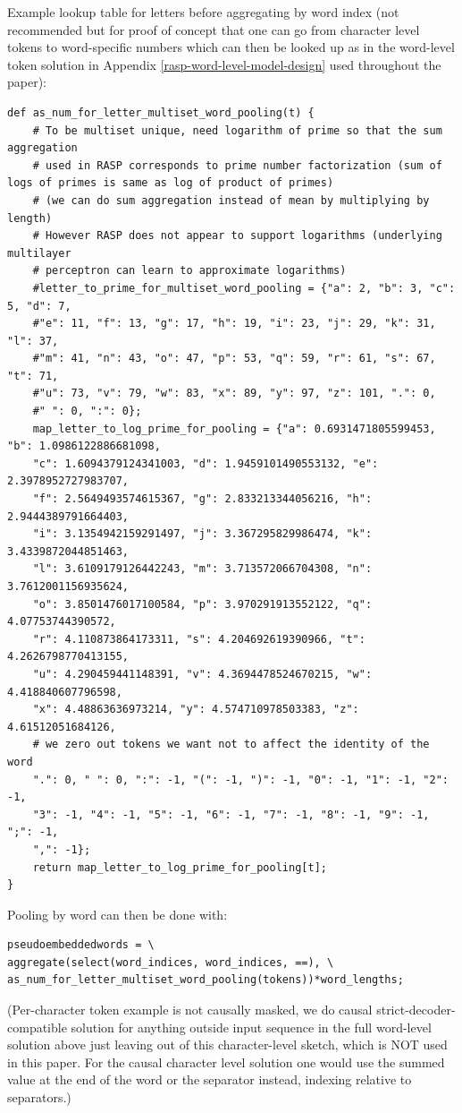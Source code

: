 \documentclass[11pt]{article}
\begin{document}
Example lookup table for letters before aggregating by word index (not recommended but for proof of concept that one can go from character level tokens to word-specific numbers which can then be looked up as in the word-level token solution in Appendix \ref{rasp-word-level-model-design} used throughout the paper):
\clearpage
\begin{tiny}
\begin{verbatim}
def as_num_for_letter_multiset_word_pooling(t) {
    # To be multiset unique, need logarithm of prime so that the sum aggregation
    # used in RASP corresponds to prime number factorization (sum of logs of primes is same as log of product of primes) 
    # (we can do sum aggregation instead of mean by multiplying by length)
    # However RASP does not appear to support logarithms (underlying multilayer 
    # perceptron can learn to approximate logarithms)
    #letter_to_prime_for_multiset_word_pooling = {"a": 2, "b": 3, "c": 5, "d": 7, 
    #"e": 11, "f": 13, "g": 17, "h": 19, "i": 23, "j": 29, "k": 31, "l": 37, 
    #"m": 41, "n": 43, "o": 47, "p": 53, "q": 59, "r": 61, "s": 67, "t": 71, 
    #"u": 73, "v": 79, "w": 83, "x": 89, "y": 97, "z": 101, ".": 0, 
    #" ": 0, ":": 0};
    map_letter_to_log_prime_for_pooling = {"a": 0.6931471805599453, "b": 1.0986122886681098, 
    "c": 1.6094379124341003, "d": 1.9459101490553132, "e": 2.3978952727983707, 
    "f": 2.5649493574615367, "g": 2.833213344056216, "h": 2.9444389791664403, 
    "i": 3.1354942159291497, "j": 3.367295829986474, "k": 3.4339872044851463, 
    "l": 3.6109179126442243, "m": 3.713572066704308, "n": 3.7612001156935624, 
    "o": 3.8501476017100584, "p": 3.970291913552122, "q": 4.07753744390572, 
    "r": 4.110873864173311, "s": 4.204692619390966, "t": 4.2626798770413155, 
    "u": 4.290459441148391, "v": 4.3694478524670215, "w": 4.418840607796598, 
    "x": 4.48863636973214, "y": 4.574710978503383, "z": 4.61512051684126,
    # we zero out tokens we want not to affect the identity of the word
    ".": 0, " ": 0, ":": -1, "(": -1, ")": -1, "0": -1, "1": -1, "2": -1, 
    "3": -1, "4": -1, "5": -1, "6": -1, "7": -1, "8": -1, "9": -1, ";": -1, 
    ",": -1};
    return map_letter_to_log_prime_for_pooling[t];
}
\end{verbatim}
\end{tiny}

Pooling by word can then be done with:
\begin{tiny}
\begin{verbatim}
pseudoembeddedwords = \
aggregate(select(word_indices, word_indices, ==), \
as_num_for_letter_multiset_word_pooling(tokens))*word_lengths;
\end{verbatim}
\end{tiny}
(Per-character token example is not causally masked, we do causal strict-decoder-compatible solution for anything outside input sequence in the full word-level solution above just leaving out of this character-level sketch, which is NOT used in this paper. For the causal character level solution one would use the summed value at the end of the word or the separator instead, indexing relative to separators.) 
\end{document}
